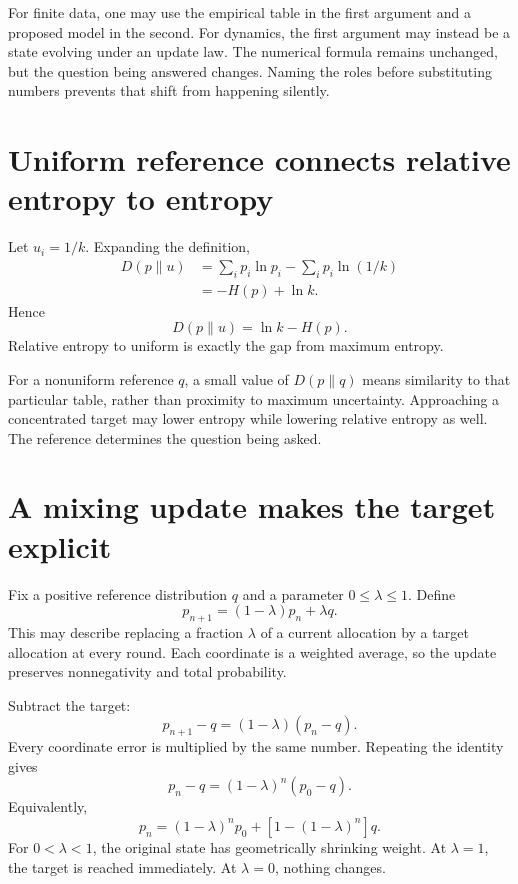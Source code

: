 \documentclass[11pt,oneside,openany]{book}
\theoremstyle{definition}
\theoremstyle{remark}
\numberwithin{equation}{chapter}
\begin{document}
For finite data, one may use the empirical table in the first argument and a proposed model in the second. For dynamics, the first argument may instead be a state evolving under an update law. The numerical formula remains unchanged, but the question being answered changes. Naming the roles before substituting numbers prevents that shift from happening silently.

\section{Uniform reference connects relative entropy to entropy}\label{ch06-uniform-reference-connects-relative-entropy-to-entropy}

Let \(u_i=1/k\). Expanding the definition, \[\begin{aligned}
D(p\|u)
&=\sum_i p_i\ln p_i-\sum_i p_i\ln(1/k)\\
&=-H(p)+\ln k.
\end{aligned}\] Hence \[\boxed{D(p\|u)=\ln k-H(p).}\] Relative entropy to uniform is exactly the gap from maximum entropy.

For a nonuniform reference \(q\), a small value of \(D(p\|q)\) means similarity to that particular table, rather than proximity to maximum uncertainty. Approaching a concentrated target may lower entropy while lowering relative entropy as well. The reference determines the question being asked.

\section{A mixing update makes the target explicit}\label{ch06-a-mixing-update-makes-the-target-explicit}

Fix a positive reference distribution \(q\) and a parameter \(0\leq\lambda\leq1\). Define \[p_{n+1}=(1-\lambda)p_n+\lambda q.\] This may describe replacing a fraction \(\lambda\) of a current allocation by a target allocation at every round. Each coordinate is a weighted average, so the update preserves nonnegativity and total probability.

Subtract the target: \[p_{n+1}-q=(1-\lambda)(p_n-q).\] Every coordinate error is multiplied by the same number. Repeating the identity gives \[\boxed{p_n-q=(1-\lambda)^n(p_0-q).}\] Equivalently, \[p_n=(1-\lambda)^n p_0+[1-(1-\lambda)^n]q.\] For \(0<\lambda<1\), the original state has geometrically shrinking weight. At \(\lambda=1\), the target is reached immediately. At \(\lambda=0\), nothing changes.
\end{document}
